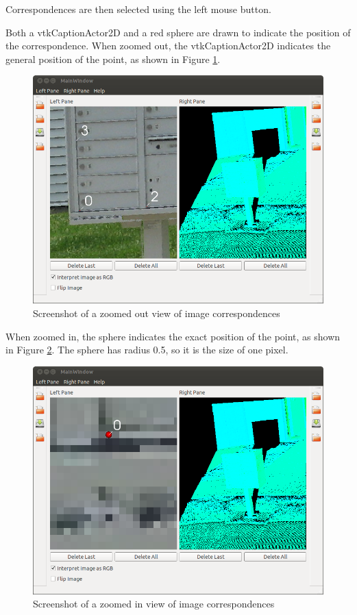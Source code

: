 \documentclass{InsightArticle}
\begin{document}
Correspondences are then selected using the left mouse button.

Both a vtkCaptionActor2D and a red sphere are drawn to indicate the position of the correspondence. When zoomed out, the vtkCaptionActor2D indicates the general position of the point, as shown in Figure \ref{fig:ImageZoomedOut}.
\begin{center}
  \begin{figure}[H]
  \centering
    \includegraphics[width=0.6\linewidth]{images/ImageZoomedOut}
    \caption{Screenshot of a zoomed out view of image correspondences}
    \label{fig:ImageZoomedOut}
  \end{figure}
\end{center} 

When zoomed in, the sphere indicates the exact position of the point, as shown in Figure \ref{fig:ImageZoomedIn}. The sphere has radius 0.5, so it is the size of one pixel.

\begin{center}
  \begin{figure}[H]
  \centering
    \includegraphics[width=0.6\linewidth]{images/ImageZoomedIn}
    \caption{Screenshot of a zoomed in view of image correspondences}
    \label{fig:ImageZoomedIn}
  \end{figure}
\end{center} 
\end{document}
